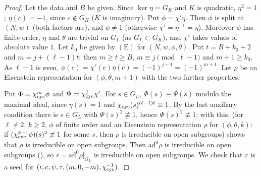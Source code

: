 \begin{proof}
Let the data and $B$ be given. Since $\ker\eta=G_K$ and $K$ is quadratic, $\eta^2=1$; $\eta(c)=-1$, since $c\notin G_K$ ($K$ is imaginary). Put
$\phi=\chi'\eta$. Then $\phi$ is split at $(N,w)$ (both factors are), and $\phi\ne1$ (otherwise $\chi'=\eta^{-1}=\eta$). Moreover $\phi$ has finite
order, $\eta$ and $\theta$ are trivial on $G_L$ (as $G_L\subset G_K$), and $\chi'$ takes values of absolute value $1$. Let $k_0$ be given by
$(\mathrm{E})$ for $(N,w,\phi,\theta)$. Put $t=B+k_0+2$ and $m=j+(\ell-1)t$; then $m\ge t\ge B$, $m\equiv j\pmod{\ell-1}$ and $m+1\ge k_0$. As
$\ell-1$ is even, $\phi(c)=\chi'(c)\eta(c)=(-1)^{j+1}=(-1)^{m+1}$. Let $\rho$ be an Eisenstein representation for $(\phi,\theta,m+1)$ with the two
further properties.

Put $\Phi=\chi_{\mathrm{cyc}}^m\phi$ and $\Psi=\chi_{\mathrm{cyc}}^j\chi'$. For $s\in G_L$, $\Phi(s)\equiv\Psi(s)$ modulo the maximal ideal, since $\eta(s)=1$ and
$\chi_{\mathrm{cyc}}(s)^{(\ell-1)t}\equiv1$. By the last auxiliary condition there is $s\in G_L$ with $\Psi(s)^2\not\equiv1$, hence $\Phi(s)^2\not\equiv1$; with
this,  (for $\ell\ne2$, $k\ge2$, $\phi$ of finite order and an Eisenstein representation $\rho$ for $(\phi,\theta,k)$:
if $(\chi_{\mathrm{cyc}}^{k-1}\phi)(s)^2\not\equiv1$ for some $s$, then $\rho$ is irreducible on open subgroups) shows that $\rho$ is irreducible on open
subgroups. Then $\mathrm{ad}^0\rho$ is irreducible on open subgroups (), so $r=\mathrm{ad}^0\rho|_{G_L}$ is
irreducible on open subgroups. We check that $r$ is a seed for $(\iota,c,\psi,\tau,(m,0,-m),\chi_{\mathrm{cyc}}^{-1})$.


\end{proof}
